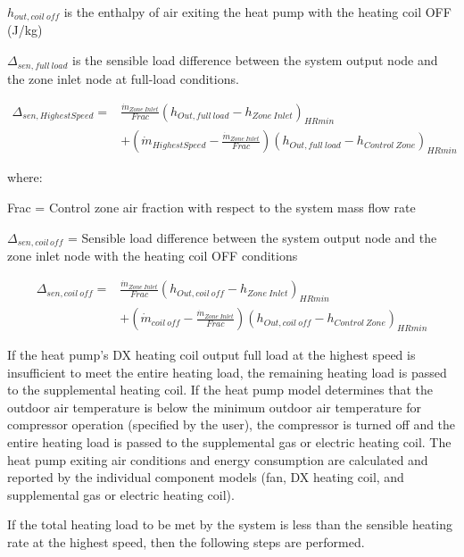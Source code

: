 \(h_{out,coil~off}\) is the enthalpy of air exiting the heat pump with the heating coil OFF (J/kg)

\(\Delta_{sen,full~load}\) is the sensible load difference between the system output node and the zone inlet node at full-load conditions.

\begin{equation}
\begin{array}{rl}
{\Delta_{sen,HighestSpeed}} =& \frac{{{{\dot m}_{Zone~Inlet}}}}{{Frac}}{\left( {{h_{Out,full~load}} - {h_{Zone~Inlet}}} \right)_{HRmin}} \\
 & + \left( {{{\dot m}_{HighestSpeed}} - \frac{{{{\dot m}_{Zone~Inlet}}}}{{Frac}}} \right){\left( {h_{Out,full~load} - {h_{Control~Zone}}} \right)_{HRmin}}
\end{array}
\end{equation}

where:

Frac = Control zone air fraction with respect to the system mass flow rate

\(\Delta_{sen,coil\, off}\) = Sensible load difference between the system output node and the zone inlet node with the heating coil OFF conditions

\begin{equation}
\begin{array}{rl}
{\Delta_{sen,coil~off}} =& \frac{{{{\dot m}_{Zone~Inlet}}}}{{Frac}}{\left( {{h_{Out,coil~off}} - {h_{Zone~Inlet}}} \right)_{HRmin}} \\
 & + \left( {{{\dot m}_{coil~off}} - \frac{{{{\dot m}_{Zone~Inlet}}}}{{Frac}}} \right){\left( {{h_{Out,coil~off}} - {h_{Control~Zone}}} \right)_{HRmin}}
\end{array}
\end{equation}

If the heat pump's DX heating coil output full load at the highest speed is insufficient to meet the entire heating load, the remaining heating load is passed to the supplemental heating coil. If the heat pump model determines that the outdoor air temperature is below the minimum outdoor air temperature for compressor operation (specified by the user), the compressor is turned off and the entire heating load is passed to the supplemental gas or electric heating coil. The heat pump exiting air conditions and energy consumption are calculated and reported by the individual component models (fan, DX heating coil, and supplemental gas or electric heating coil).

If the total heating load to be met by the system is less than the sensible heating rate at the highest speed, then the following steps are performed.

